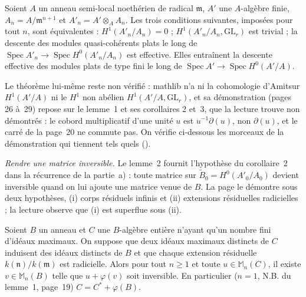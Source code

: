 \begin{encadre}
\begin{theoreme*}\nonverifie
Soient $A$ un anneau semi-local noethérien de radical $\mathfrak m$, $A'$ une $A$-algèbre finie, $A_n = A/\mathfrak m^{n+1}$ et $A'_n = A' \otimes_A A_n$. Les trois conditions suivantes, imposées pour tout $n$, sont équivalentes : $H^1(A'_n/A_n) = 0$ ; $H^1(A'_n/A_n, \mathrm{GL}_r)$ est trivial ; la descente des modules quasi-cohérents plats le long de $\operatorname{Spec} A'_n \to \operatorname{Spec} H^0(A'_n/A_n)$ est effective. Elles entraînent la descente effective des modules plats de type fini le long de $\operatorname{Spec} A' \to \operatorname{Spec} H^0(A'/A)$.
\end{theoreme*}
\end{encadre}
{\small Le théorème lui-même reste non vérifié : mathlib n'a ni la cohomologie d'Amitsur $H^1(A'/A)$ ni le $H^1$ non abélien $H^1(A'/A, \mathrm{GL}_r)$, et sa démonstration (pages 26 à~29) repose sur le lemme~1 et ses corollaires 2 et~3, que la lecture trouve non démontrés : le cobord multiplicatif d'une unité $u$ est $u^{-1}\partial(u)$, non $\partial(u)$, et le carré de la page~20 ne commute pas. On vérifie ci-dessous les morceaux de la démonstration qui tiennent tels quels ().\par}

\noindent\emph{Rendre une matrice inversible.} Le lemme~2 fournit l'hypothèse du corollaire~2 dans la récurrence de la partie~a) : toute matrice sur $\widetilde B_0 = H^0(A'_0/A_0)$ devient inversible quand on lui ajoute une matrice venue de $B$. La page le démontre sous deux hypothèses, (i) corps résiduels infinis et (ii) extensions résiduelles radicielles ; la lecture observe que (i) est superflue sous (ii).

\begin{encadre}
\begin{theoreme}\label{thm:128-lemme2}
Soient $B$ un anneau et $C$ une $B$-algèbre entière n'ayant qu'un nombre fini d'idéaux maximaux. On suppose que deux idéaux maximaux distincts de $C$ induisent des idéaux distincts de $B$ et que chaque extension résiduelle $k(\mathfrak n)/k(\mathfrak m)$ est radicielle. Alors pour tout $n \geq 1$ et toute $u \in \mathbb M_n(C)$, il existe $v \in \mathbb M_n(B)$ telle que $u + \varphi(v)$ soit inversible. En particulier ($n = 1$, N.B. du lemme~1, page~19) $C = C^* + \varphi(B)$.
\end{theoreme}
\end{encadre}

